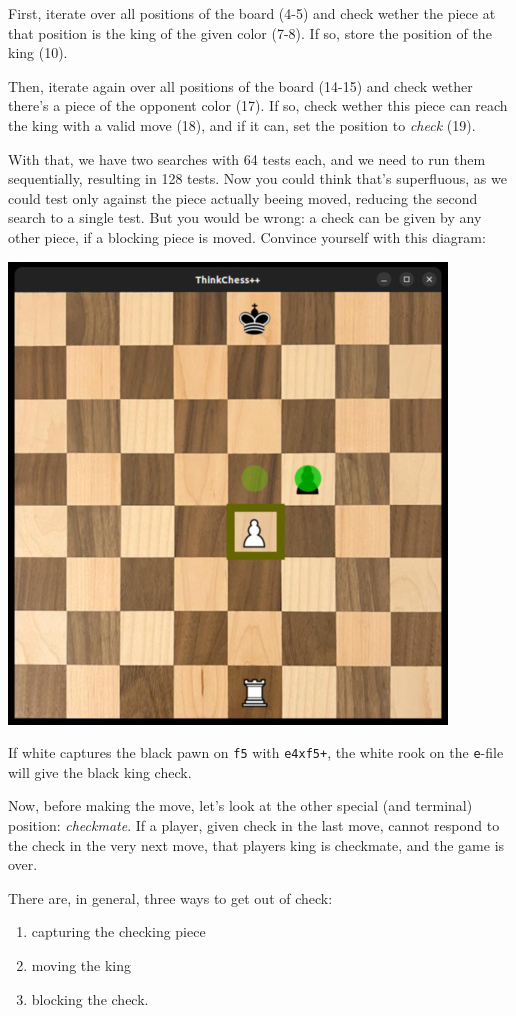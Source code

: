 First, iterate over all positions of the board (4-5) and check wether the piece at that position
is the king of the given color (7-8).
If so, store the position of the king (10).

Then, iterate again over all positions of the board (14-15) and check wether there's a piece
of the opponent color (17).
If so, check wether this piece can reach the king with a valid move (18), and if it can,
set the position to \emph{check} (19).

With that, we have two searches with 64 tests each, and we need to run them sequentially,
resulting in 128 tests.
Now you could think that's superfluous, as we could test only against the piece actually beeing
moved, reducing the second search to a single test.
But you would be wrong: a check can be given by any other piece, if a blocking piece is moved.
Convince yourself with this diagram:

\begin{center}
\includegraphics[width=.5\linewidth]{img/check.jpg}
\end{center}

If white captures the black pawn on \texttt{f5} with \texttt{e4xf5+}, the white rook on the
\texttt{e}-file will give the black king check.

Now, before making the move, let's look at the other special (and terminal) position: \emph{checkmate}.
If a player, given check in the last move, cannot respond to the check in the very next move, that
players king is checkmate, and the game is over.

There are, in general, three ways to get out of check:

\begin{enumerate}
  \item capturing the checking piece
  \item moving the king
  \item blocking the check.
\end{enumerate}


